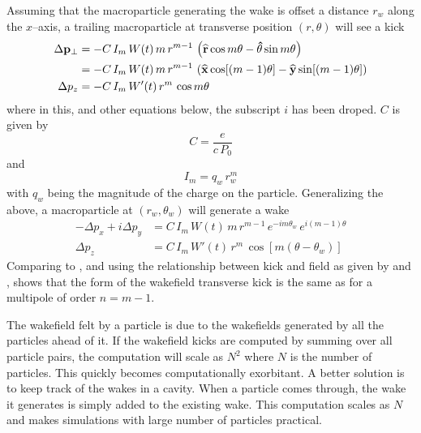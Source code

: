 Assuming that the macroparticle generating the wake is offset a distance $r_w$ along the $x$--axis,
a trailing macroparticle at transverse position $(r, \theta)$ will see a kick
\begin{align}
  \Delta {{\bf p}}_\perp &= 
    -C \, I_m \, W(t) \, m \, r^{m-1} \, \left( 
    {\widehat{\bf r}} \cos m\theta - {\bf\hat\theta} \sin m\theta \right) \\
  &= -C \, I_m \, W(t) \, m \, r^{m-1} \, \left( {\widehat{\bf x}} \cos [(m-1) \theta] - 
    {\widehat{\bf y}} \sin [(m-1)\theta] \right) \nonumber \\
  \Delta p_z &= -C \, I_m \, W'(t) \, r^m \, \cos m\theta
\end{align}
where in this, and other equations below, the subscript $i$ has been droped. $C$ is given by
\begin{equation}
  C = \frac{e}{c \, P_0}
\end{equation}
 and
\begin{equation}
  I_m = q_w \, r_w^m
\end{equation}
with $q_w$ being the magnitude of the charge on the particle.  Generalizing the above, a
macroparticle at $(r_w, \theta_w)$ will generate a wake
\begin{align}
  -\Delta p_x + i\Delta p_y &= C \, I_m \, W(t) \, 
    m \, r^{m-1} \, e^{-i m \theta_w} \, e^{i (m-1) \theta} 
    \label{ppcimr} \\
  \Delta p_z &= C \, I_m \, W'(t) \, r^m \, \cos [m(\theta - \theta_w)]
    \label{pciwr}
\end{align}
Comparing  to , and using the relationship between kick and field as given by
 and , shows that the form of the wakefield transverse kick is the same as
for a multipole of order $n = m - 1$.

The wakefield felt by a particle is due to the wakefields generated by all the particles ahead of
it. If the wakefield kicks are computed by summing over all particle pairs, the computation will
scale as $N^2$ where $N$ is the number of particles. This quickly becomes computationally
exorbitant. A better solution is to keep track of the wakes in a cavity. When a particle comes
through, the wake it generates is simply added to the existing wake. This computation scales as $N$
and makes simulations with large number of particles practical.


